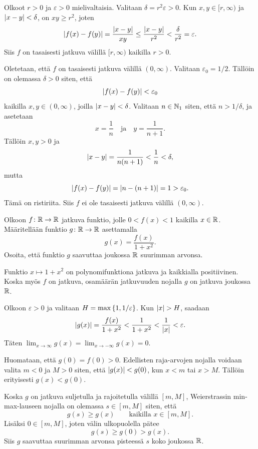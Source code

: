 \documentclass[11pt,a4paper]{amsart}
\begin{document}
\begin{solution}
  Olkoot \(r > 0\) ja \(\varepsilon > 0\) mielivaltaisia.
  Valitaan \(\delta = r^2\varepsilon > 0\).
  Kun \(x,y \in [r,\infty)\) ja \(\lvert x-y\rvert < \delta\), on
  \(xy \geq r^2\), joten
  \[
    \lvert f(x)-f(y)\rvert = \frac{\lvert x-y\rvert}{xy}
    \leq \frac{\lvert x-y\rvert}{r^2}
    < \frac{\delta}{r^2} = \varepsilon.
  \]
  Siis \(f\) on tasaisesti jatkuva välillä \([r,\infty)\) kaikilla
  \(r > 0\).

  Oletetaan, että \(f\) on tasaisesti jatkuva välillä \((0, \infty)\).
  Valitaan \(\varepsilon_0 = 1/2\). Tällöin on olemassa \(\delta > 0\)
  siten, että
  \[
    \lvert f(x)-f(y)\rvert < \varepsilon_0
  \]
  kaikilla \(x,y \in (0,\infty)\), joilla \(\lvert x-y\rvert < \delta\).
  Valitaan \(n \in \mathbb{N}_1\) siten, että \(n > 1/\delta\), ja asetetaan
  \[
    x = \frac{1}{n} \quad \text{ja} \quad y = \frac{1}{n + 1}.
  \]
  Tällöin \(x,y > 0\) ja
  \[
    \lvert x - y\rvert = \frac{1}{n(n + 1)} < \frac{1}{n} < \delta,
  \]
  mutta
  \[
    \lvert f(x)-f(y)\rvert = \lvert n-(n+1)\rvert = 1 > \varepsilon_0.
  \]
  Tämä on ristiriita. Siis
  \(f\) ei ole tasaisesti jatkuva välillä \((0, \infty)\).
\end{solution}

\begin{exercise}
  Olkoon \(f \colon \mathbb{R} \to \mathbb{R}\) jatkuva funktio, jolle \(0 < f(x) < 1\)
  kaikilla \(x \in \mathbb{R}\). Määritellään funktio \(g \colon \mathbb{R} \to \mathbb{R}\)
  asettamalla
  \[
    g(x) = \frac{f(x)}{1 + x^2}.
  \]
  Osoita, että funktio \(g\) saavuttaa joukossa \(\mathbb{R}\) suurimman arvonsa.
\end{exercise}

\begin{solution}
  Funktio \(x \mapsto 1+x^2\) on polynomifunktiona jatkuva ja
  kaikkialla positiivinen. Koska myös \(f\) on jatkuva, osamäärän
  jatkuvuuden nojalla \(g\) on jatkuva joukossa \(\mathbb{R}\).

  Olkoon \(\varepsilon > 0\) ja valitaan
  \(H = \max\left\lbrace1,1/\varepsilon\right\rbrace\). Kun \(\lvert x\rvert > H\), saadaan
  \[
    \lvert g(x)\rvert = \frac{f(x)}{1+x^2}
    < \frac{1}{1+x^2} < \frac{1}{\lvert x\rvert} < \varepsilon.
  \]
  Täten \(\lim_{x \to \infty} g(x) = \lim_{x \to -\infty} g(x) = 0\).

  Huomataan, että \(g(0) = f(0) > 0\). Edellisten raja-arvojen nojalla
  voidaan valita \(m < 0\) ja \(M > 0\) siten, että \(\lvert g(x)\rvert < g(0)\),
  kun \(x < m\) tai \(x > M\). Tällöin erityisesti \(g(x) < g(0)\).

  Koska \(g\) on jatkuva suljetulla ja rajoitetulla välillä \([m,M]\),
  Weierstrassin min-max-lauseen nojalla on olemassa \(s \in [m,M]\)
  siten, että
  \[
    g(s) \geq g(x) \qquad \text{kaikilla } x \in [m, M].
  \]
  Lisäksi \(0 \in [m,M]\), joten välin ulkopuolella pätee
  \[
    g(s) \geq g(0) > g(x).
  \]
  Siis \(g\) saavuttaa suurimman arvonsa pisteessä \(s\) koko joukossa
  \(\mathbb{R}\).
\end{solution}
\end{document}
